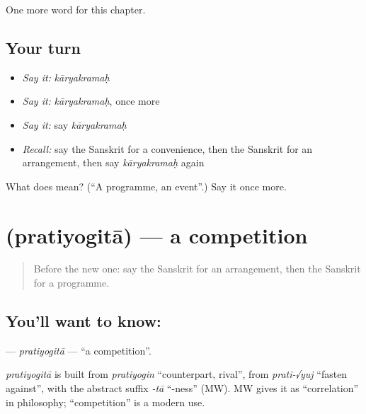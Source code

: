 \begin{grammarlens}[title={What you've built}]
One more word for this chapter.
\end{grammarlens}

\subsection*{Your turn}
\begin{itemize}
\raggedright
  \item \emph{Say it:} \emph{kāryakramaḥ}
  \item \emph{Say it:} \emph{kāryakramaḥ}, once more
  \item \emph{Say it:} say \emph{kāryakramaḥ}
  \item \emph{Recall:} say the Sanskrit for a convenience, then the Sanskrit for an arrangement, then say \emph{kāryakramaḥ} again
\end{itemize}

\begin{tcolorbox}[breakable,colback=teal!4,colframe=teal!35!black,title={Before you move on}]
What does  mean? (\textquotedblleft{}A programme, an event\textquotedblright{}.) Say it once more.
\end{tcolorbox}
\section[\texorpdfstring{\sk{प्रतियोगिता} (pratiyogitā)}{प्रतियोगिता (pratiyogitā)}]{ (pratiyogitā) — a competition}

\label{lesson:SA-C171-pratiyogita}



\begin{quote}
Before the new one: say the Sanskrit for an arrangement, then the Sanskrit for a programme.
\end{quote}

\subsection*{You'll want to know: }
\textbf{} — \emph{pratiyogitā} — \textquotedblleft{}a competition\textquotedblright{}.

\begin{cousinweb}
\emph{pratiyogitā} is built from \emph{pratiyogin} \textquotedblleft{}counterpart, rival\textquotedblright{}, from \emph{prati-√yuj} \textquotedblleft{}fasten against\textquotedblright{}, with the abstract suffix \emph{-tā} \textquotedblleft{}-ness\textquotedblright{} (MW). MW gives it as \textquotedblleft{}correlation\textquotedblright{} in philosophy; \textquotedblleft{}competition\textquotedblright{} is a modern use.
\end{cousinweb}

